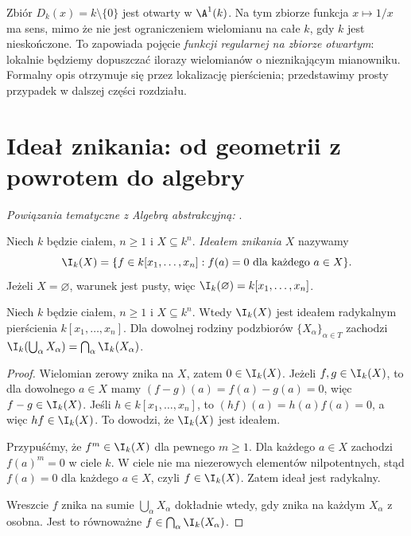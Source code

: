 \begin{uwaga}
Zbiór $D_k(x)=k\setminus\{0\}$ jest otwarty w $\A^1(k)$.
Na tym zbiorze funkcja $x\mapsto1/x$ ma sens, mimo że nie jest
ograniczeniem wielomianu na całe $k$, gdy $k$ jest nieskończone.
To zapowiada pojęcie \emph{funkcji regularnej na zbiorze otwartym}:
lokalnie będziemy dopuszczać ilorazy wielomianów o nieznikającym
mianowniku. Formalny opis otrzymuje się przez lokalizację pierścienia;
przedstawimy prosty przypadek w dalszej części rozdziału.
\end{uwaga}

\section{Ideał znikania: od geometrii z powrotem do algebry}

\noindent\emph{Powiązania tematyczne z Algebrą abstrakcyjną:} .


\begin{definicja}
Niech $k$ będzie ciałem, $n\ge1$ i $X\subseteq k^n$.
\emph{Ideałem znikania} $X$ nazywamy
\[
\I_k(X)=\{f\in k[x_1,\dots,x_n]:f(a)=0\text{ dla każdego }a\in X\}.
\]
Jeżeli $X=\varnothing$, warunek jest pusty, więc
$\I_k(\varnothing)=k[x_1,\dots,x_n]$.
\end{definicja}

\begin{twierdzenie}
\label{tw:I-basic}
Niech $k$ będzie ciałem, $n\ge1$ i $X\subseteq k^n$.
Wtedy $\I_k(X)$ jest ideałem radykalnym pierścienia
$k[x_1,\dots,x_n]$. Dla dowolnej rodziny podzbiorów
$\{X_\alpha\}_{\alpha\in T}$ zachodzi
$\I_k(\bigcup_\alpha X_\alpha)=\bigcap_\alpha\I_k(X_\alpha)$.
\end{twierdzenie}
\begin{proof}
Wielomian zerowy znika na $X$, zatem $0\in\I_k(X)$.
Jeżeli $f,g\in\I_k(X)$, to dla dowolnego $a\in X$ mamy
$(f-g)(a)=f(a)-g(a)=0$, więc $f-g\in\I_k(X)$.
Jeśli $h\in k[x_1,\dots,x_n]$, to $(hf)(a)=h(a)f(a)=0$,
a więc $hf\in\I_k(X)$. To dowodzi, że $\I_k(X)$ jest ideałem.

Przypuśćmy, że $f^m\in\I_k(X)$ dla pewnego $m\ge1$.
Dla każdego $a\in X$ zachodzi $f(a)^m=0$ w ciele $k$.
W ciele nie ma niezerowych elementów nilpotentnych, stąd
$f(a)=0$ dla każdego $a\in X$, czyli $f\in\I_k(X)$.
Zatem ideał jest radykalny.

Wreszcie $f$ znika na sumie $\bigcup_\alpha X_\alpha$
dokładnie wtedy, gdy znika na każdym $X_\alpha$ z osobna.
Jest to równoważne $f\in\bigcap_\alpha\I_k(X_\alpha)$.
\end{proof}

